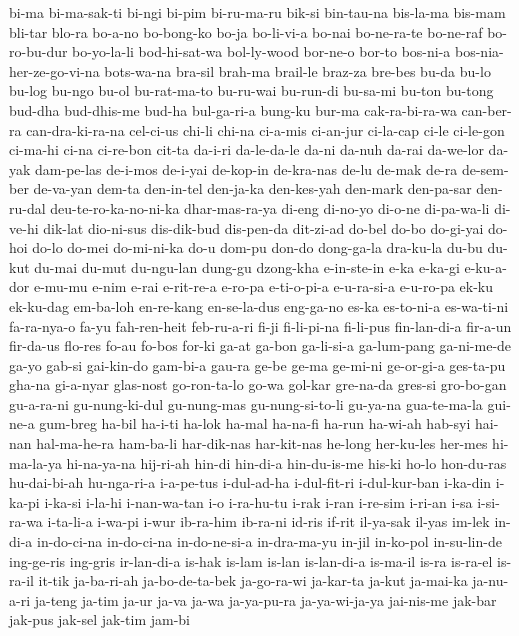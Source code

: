 {bi-ma bi-ma-sak-ti bi-ngi bi-pim bi-ru-ma-ru bik-si bin-tau-na bis-la-ma
bis-mam bli-tar blo-ra bo-a-no bo-bong-ko bo-ja bo-li-vi-a bo-nai
bo-ne-ra-te bo-ne-raf bo-ro-bu-dur bo-yo-la-li bod-hi-sat-wa bol-ly-wood
bor-ne-o bor-to bos-ni-a bos-nia-her-ze-go-vi-na bots-wa-na bra-sil
brah-ma brail-le braz-za bre-bes bu-da bu-lo bu-log bu-ngo bu-ol
bu-rat-ma-to bu-ru-wai bu-run-di bu-sa-mi bu-ton bu-tong bud-dha
bud-dhis-me bud-ha bul-ga-ri-a bung-ku bur-ma cak-ra-bi-ra-wa can-ber-ra
can-dra-ki-ra-na cel-ci-us chi-li chi-na ci-a-mis ci-an-jur ci-la-cap
ci-le ci-le-gon ci-ma-hi ci-na ci-re-bon cit-ta da-i-ri da-le-da-le da-ni
da-nuh da-rai da-we-lor da-yak dam-pe-las de-i-mos de-i-yai de-kop-in
de-kra-nas de-lu de-mak de-ra de-sem-ber de-va-yan dem-ta den-in-tel
den-ja-ka den-kes-yah den-mark den-pa-sar den-ru-dal deu-te-ro-ka-no-ni-ka
dhar-mas-ra-ya di-eng di-no-yo di-o-ne di-pa-wa-li di-ve-hi dik-lat
dio-ni-sus dis-dik-bud dis-pen-da dit-zi-ad do-bel do-bo do-gi-yai do-hoi
do-lo do-mei do-mi-ni-ka do-u dom-pu don-do dong-ga-la dra-ku-la du-bu
du-kut du-mai du-mut du-ngu-lan dung-gu dzong-kha e-in-ste-in e-ka e-ka-gi
e-ku-a-dor e-mu-mu e-nim e-rai e-rit-re-a e-ro-pa e-ti-o-pi-a e-u-ra-si-a
e-u-ro-pa ek-ku ek-ku-dag em-ba-loh en-re-kang en-se-la-dus eng-ga-no
es-ka es-to-ni-a es-wa-ti-ni fa-ra-nya-o fa-yu fah-ren-heit feb-ru-a-ri
fi-ji fi-li-pi-na fi-li-pus fin-lan-di-a fir-a-un fir-da-us flo-res fo-au
fo-bos for-ki ga-at ga-bon ga-li-si-a ga-lum-pang ga-ni-me-de ga-yo gab-si
gai-kin-do gam-bi-a gau-ra ge-be ge-ma ge-mi-ni ge-or-gi-a ges-ta-pu
gha-na gi-a-nyar glas-nost go-ron-ta-lo go-wa gol-kar gre-na-da gres-si
gro-bo-gan gu-a-ra-ni gu-nung-ki-dul gu-nung-mas gu-nung-si-to-li gu-ya-na
gua-te-ma-la gui-ne-a gum-breg ha-bil ha-i-ti ha-lok ha-mal ha-na-fi
ha-run ha-wi-ah hab-syi hai-nan hal-ma-he-ra ham-ba-li har-dik-nas
har-kit-nas he-long her-ku-les her-mes hi-ma-la-ya hi-na-ya-na hij-ri-ah
hin-di hin-di-a hin-du-is-me his-ki ho-lo hon-du-ras hu-dai-bi-ah
hu-nga-ri-a i-a-pe-tus i-dul-ad-ha i-dul-fit-ri i-dul-kur-ban i-ka-din
i-ka-pi i-ka-si i-la-hi i-nan-wa-tan i-o i-ra-hu-tu i-rak i-ran i-re-sim
i-ri-an i-sa i-si-ra-wa i-ta-li-a i-wa-pi i-wur ib-ra-him ib-ra-ni id-ris
if-rit il-ya-sak il-yas im-lek in-di-a in-do-ci-na in-do-ci-na
in-do-ne-si-a in-dra-ma-yu in-jil in-ko-pol in-su-lin-de ing-ge-ris
ing-gris ir-lan-di-a is-hak is-lam is-lan is-lan-di-a is-ma-il is-ra
is-ra-el is-ra-il it-tik ja-ba-ri-ah ja-bo-de-ta-bek ja-go-ra-wi ja-kar-ta
ja-kut ja-mai-ka ja-nu-a-ri ja-teng ja-tim ja-ur ja-va ja-wa ja-ya-pu-ra
ja-ya-wi-ja-ya jai-nis-me jak-bar jak-pus jak-sel jak-tim jam-bi
}

